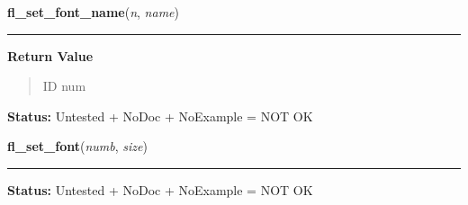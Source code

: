     \label{xformslib:library:fl_set_font_name}

    \vspace{0.5ex}

\hspace{.8\funcindent}\begin{boxedminipage}{\funcwidth}

    \raggedright \textbf{fl\_set\_font\_name}(\textit{n}, \textit{name})

    \vspace{-1.5ex}

    \rule{\textwidth}{0.5\fboxrule}
\setlength{\parskip}{2ex}
\setlength{\parskip}{1ex}
      \textbf{Return Value}
    \vspace{-1ex}

      \begin{quote}
      ID num

      \end{quote}

\textbf{Status:} Untested + NoDoc + NoExample = NOT OK



    \end{boxedminipage}

    \label{xformslib:library:fl_set_font}

    \vspace{0.5ex}

\hspace{.8\funcindent}\begin{boxedminipage}{\funcwidth}

    \raggedright \textbf{fl\_set\_font}(\textit{numb}, \textit{size})

    \vspace{-1.5ex}

    \rule{\textwidth}{0.5\fboxrule}
\setlength{\parskip}{2ex}
\setlength{\parskip}{1ex}
\textbf{Status:} Untested + NoDoc + NoExample = NOT OK



    \end{boxedminipage}

    \label{xformslib:library:fl_get_char_height}

